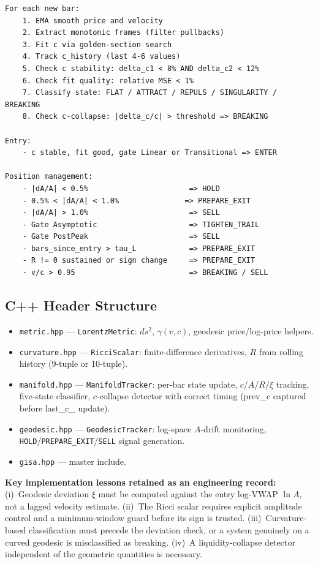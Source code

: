 \documentclass[12pt,a4paper]{article}
\begin{document}
\begin{lstlisting}[language={},basicstyle=\ttfamily\small,frame=single]
For each new bar:
    1. EMA smooth price and velocity
    2. Extract monotonic frames (filter pullbacks)
    3. Fit c via golden-section search
    4. Track c_history (last 4-6 values)
    5. Check c stability: delta_c1 < 8% AND delta_c2 < 12%
    6. Check fit quality: relative MSE < 1%
    7. Classify state: FLAT / ATTRACT / REPULS / SINGULARITY / BREAKING
    8. Check c-collapse: |delta_c/c| > threshold => BREAKING

Entry:
    - c stable, fit good, gate Linear or Transitional => ENTER

Position management:
    - |dA/A| < 0.5%                       => HOLD
    - 0.5% < |dA/A| < 1.0%               => PREPARE_EXIT
    - |dA/A| > 1.0%                       => SELL
    - Gate Asymptotic                     => TIGHTEN_TRAIL
    - Gate PostPeak                       => SELL
    - bars_since_entry > tau_L            => PREPARE_EXIT
    - R != 0 sustained or sign change     => PREPARE_EXIT
    - v/c > 0.95                          => BREAKING / SELL
\end{lstlisting}

\subsection{C++ Header Structure}

\begin{itemize}
    \item \texttt{metric.hpp} --- \texttt{LorentzMetric}: $ds^2$, $\gamma(v,c)$,
          geodesic price/log-price helpers.
    \item \texttt{curvature.hpp} --- \texttt{RicciScalar}: finite-difference
          derivatives, $R$ from rolling history (9-tuple or 10-tuple).
    \item \texttt{manifold.hpp} --- \texttt{ManifoldTracker}: per-bar state
          update, $c$/$A$/$R$/$\xi$ tracking, five-state classifier, $c$-collapse
          detector with correct timing (prev\_c captured before last\_c\_ update).
    \item \texttt{geodesic.hpp} --- \texttt{GeodesicTracker}: log-space $A$-drift
          monitoring, \texttt{HOLD}/\texttt{PREPARE\_EXIT}/\texttt{SELL} signal
          generation.
    \item \texttt{gisa.hpp} --- master include.
\end{itemize}

\textbf{Key implementation lessons retained as an engineering record:}
(i)~Geodesic deviation $\xi$ must be computed against the entry log-VWAP
$\ln A$, not a lagged velocity estimate. (ii)~The Ricci scalar requires
explicit amplitude control and a minimum-window guard before its sign is
trusted. (iii)~Curvature-based classification must precede the deviation
check, or a system genuinely on a curved geodesic is misclassified as
breaking. (iv)~A liquidity-collapse detector independent of the geometric
quantities is necessary.
\end{document}
